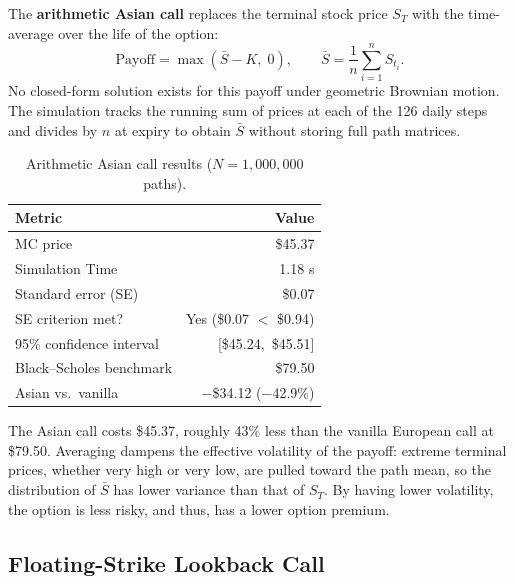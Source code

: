 \documentclass[12pt, a4paper]{article}
\begin{document}
The \textbf{arithmetic Asian call} replaces the terminal stock price $S_T$ with the
time-average over the life of the option:
\begin{equation}
    \text{Payoff} = \max(\bar{S} - K,\; 0), \qquad
    \bar{S} = \frac{1}{n} \sum_{i=1}^{n} S_{t_i}.
    \label{eq:asian}
\end{equation}
No closed-form solution exists for this payoff under geometric Brownian motion. The simulation
tracks the running sum of prices at each of the 126 daily steps and divides by $n$ at
expiry to obtain $\bar{S}$ without storing full path matrices. 

\begin{table}[H]
\centering
\caption{Arithmetic Asian call results ($N = 1{,}000{,}000$ paths).}
\label{tab:asian}
\begin{tabular}{lr}
\toprule
Metric & Value \\
\midrule
MC price                & \$45.37 \\
Simulation Time         & 1.18 s \\
Standard error (SE)     & \$0.07 \\
SE criterion met?       & Yes (\$0.07 $<$ \$0.94) \\
95\% confidence interval & [\$45.24,\ \$45.51] \\
Black--Scholes benchmark & \$79.50 \\
Asian vs.\ vanilla      & $-$\$34.12 ($-$42.9\%) \\
\bottomrule
\end{tabular}
\end{table}

The Asian call costs \$45.37, roughly 43\% less than the vanilla European call at
\$79.50. Averaging dampens the effective volatility of the payoff: extreme terminal
prices, whether very high or very low, are pulled toward the path mean, so the
distribution of $\bar{S}$ has lower variance than that of $S_T$. By having lower volatility, the option is less risky, and thus, has a lower option premium. 

\subsection{Floating-Strike Lookback Call}
\end{document}

